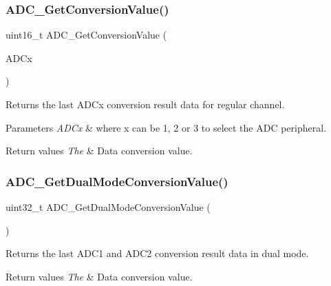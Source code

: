 \subsubsection{\texorpdfstring{ADC\_GetConversionValue()}{ADC\_GetConversionValue()}}
{\footnotesize\ttfamily uint16\+\_\+t A\+D\+C\+\_\+\+Get\+Conversion\+Value (\begin{DoxyParamCaption}\item[{\mbox{\hyperlink{struct_a_d_c___type_def}{A\+D\+C\+\_\+\+Type\+Def}} $\ast$}]{A\+D\+Cx }\end{DoxyParamCaption})}



Returns the last A\+D\+Cx conversion result data for regular channel. 


\begin{DoxyParams}{Parameters}
{\em A\+D\+Cx} & where x can be 1, 2 or 3 to select the A\+DC peripheral. \\
\hline
\end{DoxyParams}

\begin{DoxyRetVals}{Return values}
{\em The} & Data conversion value. \\
\hline
\end{DoxyRetVals}
\mbox{\label{group___a_d_c___exported___functions_gac5a4792dc29ef7ff6bfbce9f37e8a668}} 
\subsubsection{\texorpdfstring{ADC\_GetDualModeConversionValue()}{ADC\_GetDualModeConversionValue()}}
{\footnotesize\ttfamily uint32\+\_\+t A\+D\+C\+\_\+\+Get\+Dual\+Mode\+Conversion\+Value (\begin{DoxyParamCaption}\item[{void}]{ }\end{DoxyParamCaption})}



Returns the last A\+D\+C1 and A\+D\+C2 conversion result data in dual mode. 


\begin{DoxyRetVals}{Return values}
{\em The} & Data conversion value. \\
\hline
\end{DoxyRetVals}
\mbox{\label{group___a_d_c___exported___functions_gaa12546e51ec905c90a3aada432bd4633}} 

